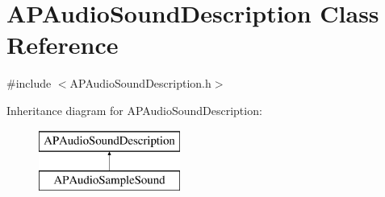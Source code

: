 \hypertarget{class_a_p_audio_sound_description}{\section{A\+P\+Audio\+Sound\+Description Class Reference}
\label{class_a_p_audio_sound_description}
}


{\ttfamily \#include $<$A\+P\+Audio\+Sound\+Description.\+h$>$}

Inheritance diagram for A\+P\+Audio\+Sound\+Description\+:\begin{figure}[H]
\begin{center}
\leavevmode
\includegraphics[height=2.000000cm]{class_a_p_audio_sound_description}
\end{center}
\end{figure}
